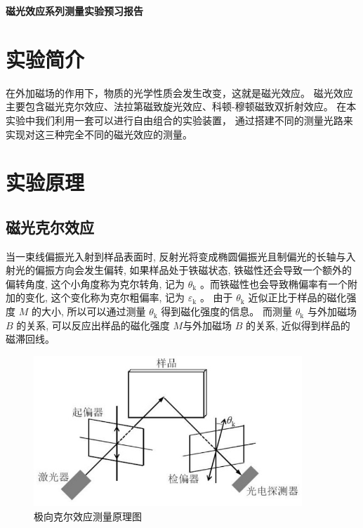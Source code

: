 \documentclass[a4paper,UTF8]{ctexart}
\begin{document}
\begin{center}
    \textbf{\Large 磁光效应系列测量实验预习报告}
    \par {}
\end{center}

\section{实验简介}

在外加磁场的作用下，物质的光学性质会发生改变，这就是磁光效应。
磁光效应主要包含磁光克尔效应、法拉第磁致旋光效应、科顿-穆顿磁致双折射效应。
在本实验中我们利用一套可以进行自由组合的实验装置，
通过搭建不同的测量光路来实现对这三种完全不同的磁光效应的测量。

\section{实验原理}

\subsection{磁光克尔效应}

当一束线偏振光入射到样品表面时, 反射光将变成椭圆偏振光且制偏光的长轴与入射光的偏振方向会发生偏转,
 如果样品处于铁磁状态, 铁磁性还会导致一个额外的偏转角度, 这个小角度称为克尔转角,
  记为 $\theta_{\mathrm{k}}$ 。而铁磁性也会导致椭偏率有一个附加的变化, 
  这个变化称为克尔粗偏率, 记为 $\varepsilon_{\mathrm{k}}$ 。
  由于 $\theta_{\mathrm{k}}$ 近似正比于样品的磁化强度 $M$ 的大小, 
  所以可以通过测量 $\theta_{\mathrm{k}}$ 得到磁化强度的信息。
  而测量 $\theta_{\mathrm{k}}$ 与外加磁场 $B$ 的关系, 
  可以反应出样品的磁化强度 $M$与外加磁场 $B$ 的关系, 近似得到样品的磁滞回线。

\begin{figure}[H]
    \centering
    \begin{minipage}[b]{0.9\textwidth}
        \centering
        \includegraphics[width=0.9\textwidth]{./fig4.jpg}
        \caption{极向克尔效应测量原理图}
    \end{minipage}
\end{figure}
\end{document}
